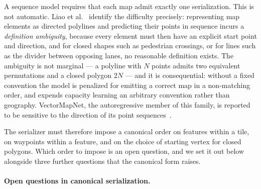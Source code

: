 \documentclass{book}
\begin{document}
A sequence model requires that each map admit exactly one
serialization.  This is not automatic.  Liao et
al.~\cite{liao2022maptr} identify the difficulty precisely:
representing map elements as directed polylines and predicting
their points in sequence incurs a \emph{definition ambiguity},
because every element must then have an explicit start point and
direction, and for closed shapes such as pedestrian crossings, or
for lines such as the divider between opposing lanes, no
reasonable definition exists.  The ambiguity is not marginal --- a
polyline with $N$ points admits two equivalent permutations and a
closed polygon $2N$ --- and it is consequential: without a fixed
convention the model is penalized for emitting a correct map in a
non-matching order, and expends capacity learning an arbitrary
convention rather than geography.  VectorMapNet, the
autoregressive member of this family, is reported to be sensitive
to the direction of its point
sequences~\cite{liu2023vectormapnet}.

The serializer must therefore impose a canonical order on
features within a tile, on waypoints within a feature, and on the
choice of starting vertex for closed polygons.  Which order to
impose is an open question, and we set it out below alongside
three further questions that the canonical form raises.

\paragraph{Open questions in canonical serialization.}
\end{document}
